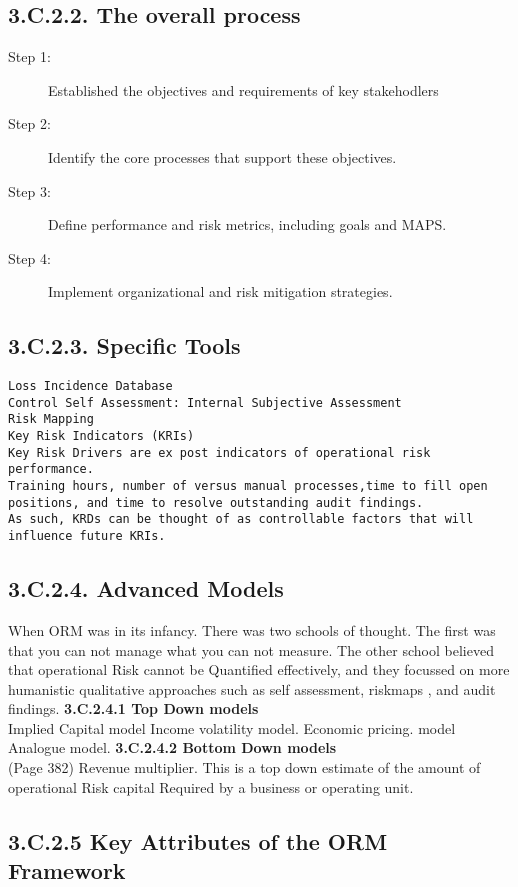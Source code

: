 \documentclass[12pt]{article}
\begin{document}
\subsection*{3.C.2.2. The overall process}
\begin{description}
\item[Step 1:] Established the objectives and requirements of key stakehodlers
\item[Step 2:] Identify the core processes that support these objectives.
\item[Step 3:] Define performance and risk metrics, including goals and MAPS.
\item[Step 4:] Implement organizational and risk mitigation strategies. 
\end{description} 
\newpage
\subsection*{3.C.2.3. Specific Tools}
\begin{verbatim}
Loss Incidence Database
Control Self Assessment: Internal Subjective Assessment
Risk Mapping
Key Risk Indicators (KRIs)
Key Risk Drivers are ex post indicators of operational risk performance.
Training hours, number of versus manual processes,time to fill open positions, and time to resolve outstanding audit findings.
As such, KRDs can be thought of as controllable factors that will influence future KRIs.
\end{verbatim}

\subsection*{3.C.2.4. Advanced Models}
 
When ORM was in its infancy. There was two schools of thought. The first was that you can not manage what you can not measure.
The other school believed that operational Risk cannot be Quantified effectively, and they focussed on more humanistic qualitative approaches such as self assessment, riskmaps , and audit findings.
\textbf{3.C.2.4.1 Top Down models}\\
Implied Capital model Income volatility model. Economic pricing. model Analogue model.
\textbf{3.C.2.4.2 Bottom Down models}\\
(Page 382)
Revenue multiplier. This is a top down estimate of the amount of operational Risk capital Required by a business or operating unit.
\subsection*{3.C.2.5 Key Attributes of the ORM Framework}
 
\end{document}
